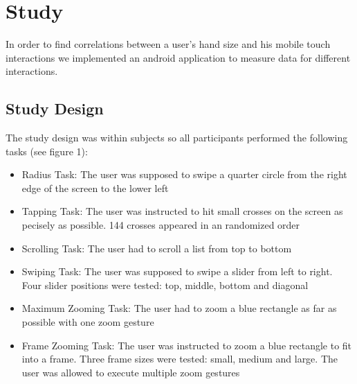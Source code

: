 \documentclass{sigchi}
\begin{document}
\section{Study}
In order to find correlations between a user's hand size and his mobile touch interactions we implemented an android application to measure data for different interactions. 

\subsection{Study Design}
The study design was within subjects so all participants performed the following tasks (see figure 1):
\begin{itemize}
	\item{Radius Task:} The user was supposed to swipe a quarter circle from the right edge of the screen to the lower left
	\item{Tapping Task:} The user was instructed to hit small crosses on the screen as pecisely as possible. 144 crosses appeared in an randomized order
	\item{Scrolling Task:} The user had to scroll a list from top to bottom
	\item{Swiping Task:} The user was supposed to swipe a slider from left to right. Four slider positions were tested: top, middle, bottom and diagonal
	\item{Maximum Zooming Task:} The user had to zoom a blue rectangle as far as possible with one zoom gesture
	\item{Frame Zooming Task:} The user was instructed to zoom a blue rectangle to fit into a frame. Three frame sizes were tested: small, medium and large. The user was allowed to execute multiple zoom gestures
\end{itemize}
 
\end{document}
